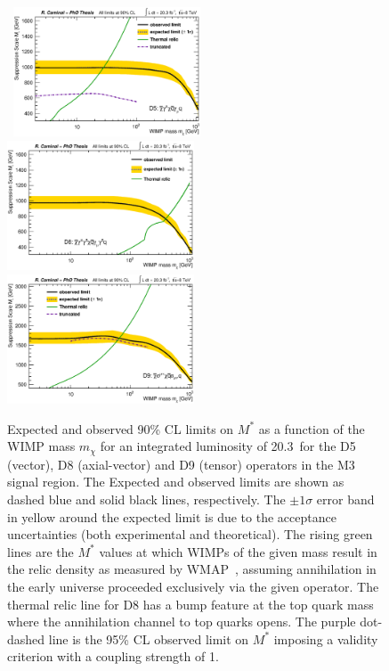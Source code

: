 

\begin{figure}[!t] 
   \centering
   \mbox{
   \includegraphics[width=0.495\textwidth]{Interpretations/Figures/WIMPmStar_D5.eps} 
   \includegraphics[width=0.495\textwidth]{Interpretations/Figures/WIMPmStar_D8.eps} 
   }
   \mbox{
   \includegraphics[width=0.495\textwidth]{Interpretations/Figures/WIMPmStar_D9.eps} 
   }
   \caption[Observed and expected 90\% CL limits on $M^*$ as a function of the WIMP mass $m_\chi$ for different operators in the selection M3.]{Expected and observed 90\% CL limits on $M^{\ast}$ as a function of the WIMP mass $m_\chi$ for an integrated luminosity of 20.3~\ifb for the D5 (vector), D8 (axial-vector) and D9 (tensor) operators in the M3 signal region. The Expected and observed limits are shown as dashed blue and solid black lines, respectively.
     The $\pm 1\sigma$ error band in yellow around the expected limit is due to the acceptance uncertainties (both experimental and theoretical). The rising green lines are the $M^{\ast}$ values at which WIMPs of the given mass result in the relic density as measured by WMAP~\cite{Larson:2010gs}, assuming annihilation in the early universe proceeded exclusively via the given operator.
     The thermal relic line for D8 has a bump feature at the top quark mass where the annihilation channel to top quarks opens.
     The purple dot-dashed  line is the 95\% CL observed limit on $M^{\ast}$ imposing a validity criterion with a coupling strength of 1.}
   \label{fig:WIMPsEffectiveMstar}
\end{figure}

